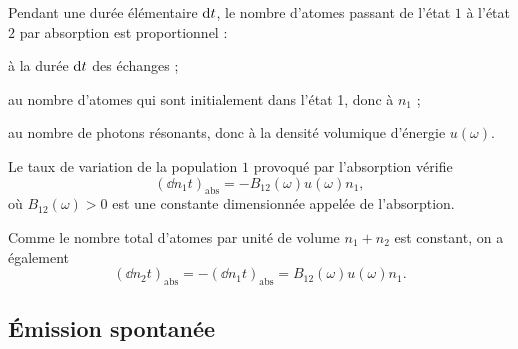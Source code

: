 \documentclass[12pt,fancy]{cours}
\begin{document}


Pendant une durée élémentaire $\mathrm{d} t$, le nombre d'atomes passant de l'état $1$ à l'état $2$ par absorption est proportionnel : 
\begin{liste}
  \item à la durée $\mathrm{d} t$ des échanges ;
  \item au nombre d'atomes qui sont initialement dans l'état 1, donc à $n_1$ ;
  \item  au nombre de photons résonants, donc à la densité volumique d'énergie $u(\omega)$.
\end{liste}

\begin{theorem}\label{form:}
  Le taux de variation de la population $1$ provoqué par l'absorption vérifie
  \begin{equation}
  \left(\dd{n_1}{t}\right)_\mathrm{abs}=-B_{12}(\omega)u(\omega)n_1,
  \label{eqn:abs}
\end{equation}
  où $B_{12}(\omega)>0$ est une constante dimensionnée appelée  de l'absorption.
\end{theorem}
\begin{remarque}
  Comme le nombre total d'atomes par unité de volume $n_1 + n_2$ est constant, on a également
  \begin{equation}
  \left(\dd{n_2}{t}\right)_\mathrm{abs} = -\left(\dd{n_1}{t}\right)_\mathrm{abs}=B_{12}(\omega)u(\omega)n_1.
  \label{eqn:pop}
  \end{equation}
\end{remarque}

\subsection{Émission spontanée}
\end{document}
